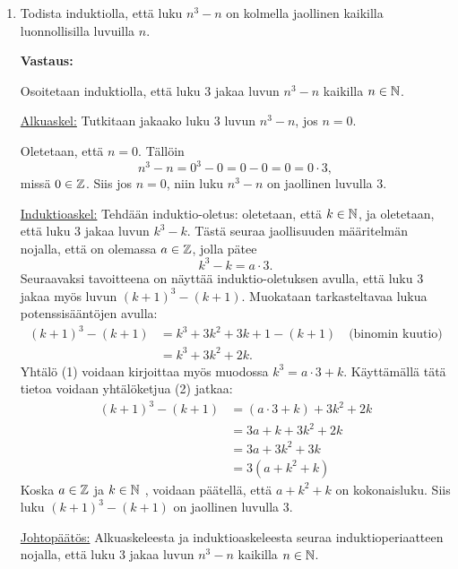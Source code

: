 \documentclass[a4paper,12pt]{article}
\begin{document}
\begin{enumerate}
\underline{Johtopäätös:} Alkuaskeleesta ja induktioaskeleesta seuraa induktioperiaatteen nojalla, että kaikilla $n\in \N$ pätee yhtälö
$$0+1+2+3+ \ldots + n=\frac{n(n+1)}{2}.$$ \vspace{0.5cm}

\item Todista induktiolla, ett\"a luku $n^3-n$ on kolmella jaollinen kaikilla luonnollisilla luvuilla $n$.

\textbf{Vastaus: }

Osoitetaan induktiolla, että luku $3$ jakaa luvun $n^3-n$ kaikilla $n \in \N$.

\underline{Alkuaskel:} Tutkitaan jakaako luku $3$ luvun $n^3-n$, jos $n=0$.

Oletetaan, että $n = 0$. Tällöin
\begin{equation*}
    n^3-n = 0^3-0=0-0=0=0\cdot 3,
\end{equation*}
missä $0 \in \mathbb{Z}$. Siis jos $n=0$, niin luku $n^3-n$ on jaollinen luvulla $3$. 

\underline{Induktioaskel:} Tehdään induktio-oletus: oletetaan, että $k\in \mathbb{N}$, ja oletetaan, että luku 3 jakaa luvun $k^3-k$. Tästä seuraa jaollisuuden määritelmän nojalla, että on olemassa $a\in \mathbb{Z}$, jolla pätee
\begin{equation*}
    k^3-k=a\cdot 3. \tag{1}
\end{equation*}
Seuraavaksi tavoitteena on näyttää induktio-oletuksen avulla, että luku 3 jakaa myös luvun $(k+1)^3-(k+1)$. Muokataan tarkasteltavaa lukua potenssisääntöjen avulla:
\begin{align*}
    (k+1)^3-(k+1)&=k^3+3k^2+3k+1-(k+1) \quad\text{(binomin kuutio)}\\
    & =k^3+3k^2+2k. \tag{2}
\end{align*}
Yhtälö (1) voidaan kirjoittaa myös muodossa $k^3=a\cdot 3+k$. Käyttämällä tätä tietoa voidaan yhtälöketjua (2) jatkaa:
\begin{align*}
    (k+1)^3-(k+1) & =(a\cdot 3+k)+3k^2+2k \\
    & = 3a+k+3k^2+2k \\
    & = 3a + 3k^2 + 3k \\
    & = 3(a+k^2+k)
\end{align*}
Koska $a\in \mathbb{Z}$ ja $k\in \mathbb{N}$ , voidaan päätellä, että $a+k^2+k$ on kokonaisluku. Siis luku $(k+1)^3-(k+1)$ on jaollinen luvulla 3.

\underline{Johtopäätös:} Alkuaskeleesta ja induktioaskeleesta seuraa induktioperiaatteen nojalla, että luku $3$ jakaa luvun $n^3-n$ kaikilla $n\in \N$. \vspace{1em}


\end{enumerate}
\end{document}
